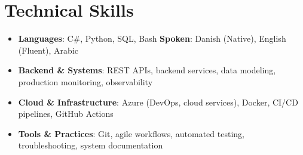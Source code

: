 \documentclass[letterpaper,11pt]{article}
\newcommand{\resumeSubHeadingListStart}{\begin{itemize}[leftmargin=*]}
\newcommand{\resumeSubHeadingListEnd}{\end{itemize}}
\begin{document}
\section{Technical Skills}
 \resumeSubHeadingListStart
   \item{
     \textbf{Languages}{: C\#, Python, SQL, Bash \hfill \textbf{Spoken}: Danish (Native), English (Fluent), Arabic}
   }
   \item{
     \textbf{Backend \& Systems}{: REST APIs, backend services, data modeling, production monitoring, observability}
   }
   \item{
     \textbf{Cloud \& Infrastructure}{: Azure (DevOps, cloud services), Docker, CI/CD pipelines, GitHub Actions}
   }
   \item{
     \textbf{Tools \& Practices}{: Git, agile workflows, automated testing, troubleshooting, system documentation}
   }
 \resumeSubHeadingListEnd


\end{document}
